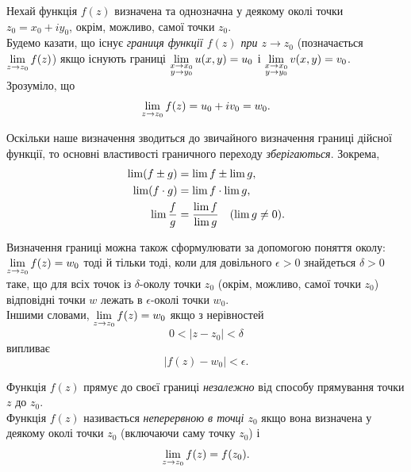 Нехай функція $f(z)$ визначена та однозначна у деякому околі точки $z_0 = x_0 + i y_0$, окрім, можливо, самої точки $z_0$. \\

Будемо казати, що існує \textit{границя функції $f(z)$ при $z \to z_0$} (позначається $\displaystyle\lim\limits_{z\to z_0} f(z)$) якщо існують границі $\displaystyle\lim\limits_{\substack{x\to x_0\\y\to y_0}} u(x, y) = u_0$ і $\displaystyle\lim\limits_{\substack{x\to x_0\\y\to y_0}} v(x, y) = v_0$. \\

Зрозуміло, що
\begin{equation}
	\label{eq:2.2.1}
	\displaystyle\lim\limits_{z \to z_0} f(z) = u_0 + i v_0 = w_0.
\end{equation}

Оскільки наше визначення зводиться до звичайного визначення границі дійсної функції, то основні властивості граничного переходу \textit{зберігаються}. Зокрема,
\begin{align}
	\label{eq:2.2.2}
	\displaystyle\lim\limits (f \pm g) &= \displaystyle\lim\limits f \pm \displaystyle\lim\limits g, \\
	\label{eq:2.2.3}
	\displaystyle\lim\limits (f \cdot g) &= \displaystyle\lim\limits f \cdot \displaystyle\lim\limits g, \\
	\label{eq:2.2.4}
	\displaystyle\lim\limits \dfrac{f}{g} &= \dfrac{\displaystyle\lim\limits f}{\displaystyle\lim\limits g} \quad (\displaystyle\lim\limits g \ne 0).
\end{align}

Визначення границі можна також сформулювати за допомогою поняття околу: $\displaystyle\lim\limits_{z \to z_0} f(z) = w_0$ тоді й тільки тоді, коли для довільного $\epsilon > 0$ знайдеться $\delta > 0$ таке, що для всіх точок із $\delta$-околу точки $z_0$ (окрім, можливо, самої точки $z_0$) відповідні точки $w$ лежать в $\epsilon$-околі точки $w_0$. \\

Іншими словами, $\displaystyle\lim\limits_{z \to z_0} f(z) = w_0$ якщо з нерівностей
\begin{equation}
	\label{eq:2.2.5}
	0 < |z - z_0| < \delta
\end{equation}
випливає
\begin{equation}
	\label{eq:2.2.6}
	|f(z) - w_0| < \epsilon.
\end{equation}

Функція $f(z)$ прямує до своєї границі \textit{незалежно} від способу прямування точки $z$ до $z_0$. \\

Функція $f(z)$ називається \textit{неперервною в точці $z_0$} якщо вона визначена у деякому околі точки $z_0$ (включаючи саму точку $z_0$) і
\begin{equation}
	\label{eq:2.2.7}
	\displaystyle\lim\limits_{z \to z_0} f(z) = f(z_0).
\end{equation}

